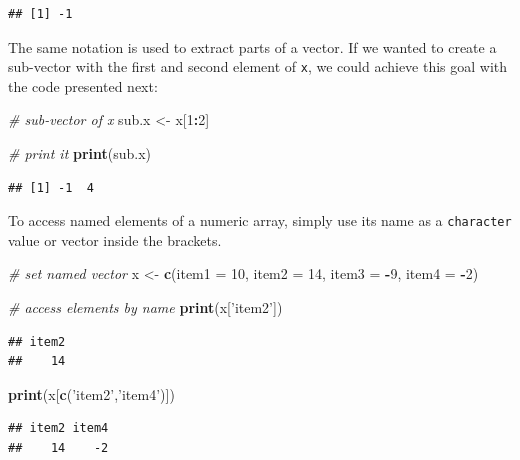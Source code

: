 \documentclass[11pt,]{book}
\newenvironment{Shaded}{\begin{snugshade}}{\end{snugshade}}
\newcommand{\KeywordTok}[1]{\textcolor[rgb]{0.27,0.27,0.27}{\textbf{#1}}}
\newcommand{\DataTypeTok}[1]{\textcolor[rgb]{0.27,0.27,0.27}{#1}}
\newcommand{\DecValTok}[1]{\textcolor[rgb]{0.06,0.06,0.06}{#1}}
\newcommand{\StringTok}[1]{\textcolor[rgb]{0.5,0.5,0.5}{#1}}
\newcommand{\CommentTok}[1]{\textcolor[rgb]{0.56,0.35,0.01}{\textit{#1}}}
\newcommand{\OperatorTok}[1]{\textcolor[rgb]{0.81,0.36,0.00}{\textbf{#1}}}
\newcommand{\NormalTok}[1]{#1}
\begin{document}
\begin{verbatim}
## [1] -1
\end{verbatim}

The same notation is used to extract parts of a vector. If we wanted to
create a sub-vector with the first and second element of \texttt{x}, we
could achieve this goal with the code presented next:

\begin{Shaded}
\begin{Highlighting}[]
\CommentTok{# sub-vector of x}
\NormalTok{sub.x <-}\StringTok{ }\NormalTok{x[}\DecValTok{1}\OperatorTok{:}\DecValTok{2}\NormalTok{]}

\CommentTok{# print it}
\KeywordTok{print}\NormalTok{(sub.x)}
\end{Highlighting}
\end{Shaded}

\begin{verbatim}
## [1] -1  4
\end{verbatim}

To access named elements of a numeric array, simply use its name as a
\texttt{character} value or vector inside the brackets.

\begin{Shaded}
\begin{Highlighting}[]
\CommentTok{# set named vector}
\NormalTok{x <-}\StringTok{ }\KeywordTok{c}\NormalTok{(}\DataTypeTok{item1 =} \DecValTok{10}\NormalTok{, }\DataTypeTok{item2 =} \DecValTok{14}\NormalTok{, }\DataTypeTok{item3 =} \OperatorTok{-}\DecValTok{9}\NormalTok{, }\DataTypeTok{item4 =} \OperatorTok{-}\DecValTok{2}\NormalTok{)}

\CommentTok{# access elements by name}
\KeywordTok{print}\NormalTok{(x[}\StringTok{'item2'}\NormalTok{])}
\end{Highlighting}
\end{Shaded}

\begin{verbatim}
## item2 
##    14
\end{verbatim}

\begin{Shaded}
\begin{Highlighting}[]
\KeywordTok{print}\NormalTok{(x[}\KeywordTok{c}\NormalTok{(}\StringTok{'item2'}\NormalTok{,}\StringTok{'item4'}\NormalTok{)])}
\end{Highlighting}
\end{Shaded}

\begin{verbatim}
## item2 item4 
##    14    -2
\end{verbatim}
\end{document}
